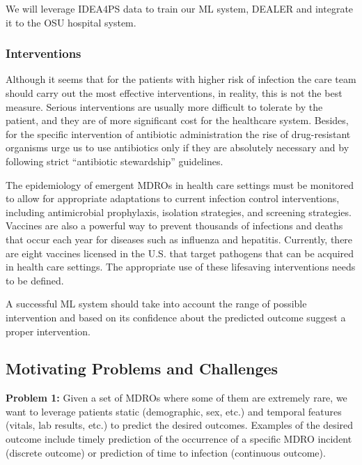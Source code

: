 We will leverage IDEA4PS data to train our ML system, DEALER and integrate it to the OSU hospital system.


\subsubsection{Interventions}
Although it seems that for the patients with higher risk of infection the care team should carry out the most effective interventions, in reality, this is not the best measure. Serious interventions are usually more difficult to tolerate by the patient, and they are of more significant cost for the healthcare system. Besides, for the specific intervention of antibiotic administration the rise of drug-resistant organisms urge us to use antibiotics only if they are absolutely necessary and by following strict ``antibiotic stewardship'' guidelines.

The epidemiology of emergent MDROs in health care settings must be monitored to allow for appropriate adaptations to current infection control interventions, including antimicrobial prophylaxis, isolation strategies, and screening strategies. Vaccines are also a powerful way to prevent thousands of infections and deaths that occur each year for diseases such as influenza and hepatitis. Currently, there are eight vaccines licensed in the U.S. that target pathogens that can be acquired in health care settings. The appropriate use of these lifesaving interventions needs to be defined.

A successful ML system should take into account the range of possible intervention and based on its confidence about the predicted outcome suggest a proper intervention.


\subsection{Motivating Problems and Challenges}
{\noindent \bf Problem 1:} Given a set of MDROs where some of them are extremely rare, we want to leverage patients static (demographic, sex, etc.) and temporal features (vitals, lab results, etc.) to predict the desired outcomes. Examples of the desired outcome include timely prediction of the occurrence of a specific MDRO incident (discrete outcome) or prediction of time to infection (continuous outcome).

